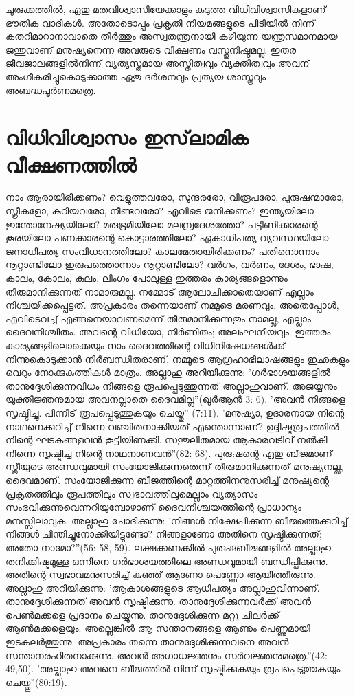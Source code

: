 ചുരുക്കത്തില്‍, ഏതു മതവിശ്വാസിയേക്കാളും കടുത്ത വിധിവിശ്വാസികളാണ് ഭൗതിക വാദികള്‍. അതോടൊപ്പം പ്രകൃതി നിയമങ്ങളുടെ പിടിയില്‍ നിന്ന് കുതറിമാറാനാവാതെ തീര്‍ത്തും അസ്വതന്ത്രനായി കഴിയുന്ന യന്ത്രസമാനമായ ജന്തുവാണ് മനുഷ്യനെന്ന അവരുടെ വീക്ഷണം വസ്തുനിഷ്ഠമല്ല. ഇതര ജീവജാലങ്ങളില്‍നിന്ന് വ്യത്യസ്തമായ അസ്തിത്വവും വ്യക്തിത്വവും അവന് അംഗീകരിച്ചുകൊടുക്കാത്ത ഏതു ദര്‍ശനവും പ്രത്യയ ശാസ്ത്രവും അബദ്ധപൂര്‍ണമത്രെ.

\section{വിധിവിശ്വാസം ഇസ്‌ലാമിക വീക്ഷണത്തില്‍}

നാം ആരായിരിക്കണം? വെളുത്തവരോ, സുന്ദരരോ, വിരൂപരോ, പുരുഷന്മാരോ, സ്ത്രീകളോ, കുറിയവരോ, നീണ്ടവരോ? എവിടെ ജനിക്കണം? ഇന്ത്യയിലോ ഇന്തോനേഷ്യയിലോ? മരുഭൂമിയിലോ മലമ്പ്രദേശത്തോ? പട്ടിണിക്കാരന്റെ കൂരയിലോ പണക്കാരന്റെ കൊട്ടാരത്തിലോ? ഏകാധിപത്യ വ്യവസ്ഥയിലോ ജനാധിപത്യ സംവിധാനത്തിലോ? കാലമേതായിരിക്കണം? പതിനൊന്നാം നൂറ്റാണ്ടിലോ ഇരുപത്തൊന്നാം നൂറ്റാണ്ടിലോ?
വര്‍ഗം, വര്‍ണം, ദേശം, ഭാഷ, കാലം, കോലം, കുലം, ലിംഗം പോലുള്ള ഇത്തരം കാര്യങ്ങളൊന്നും തീരുമാനിക്കുന്നത് നാമാരുമല്ല. നമ്മോട് ആലോചിക്കാതെയാണ് എല്ലാം നിശ്ചയിക്കപ്പെട്ടത്. അപ്രകാരം തന്നെയാണ് നമ്മുടെ മരണവും. അതെപ്പോള്‍, എവിടെവച്ച് എങ്ങനെയാവണമെന്ന് തീരുമാനിക്കുന്നതും നാമല്ല, എല്ലാം ദൈവനിശ്ചിതം. അവന്റെ വിധിയോ, നിര്‍ണിതം; അലംഘനീയവും. ഇത്തരം കാര്യങ്ങളിലൊക്കെയും നാം ദൈവത്തിന്റെ വിധിനിഷേധങ്ങള്‍ക്ക് നിന്നുകൊടുക്കാന്‍ നിര്‍ബന്ധിതരാണ്. നമ്മുടെ ആഗ്രഹാഭിലാഷങ്ങളും ഇഛകളും വെറും നോക്കുകുത്തികള്‍ മാത്രം. അല്ലാഹു അറിയിക്കുന്നു: 'ഗര്‍ഭാശയങ്ങളില്‍ താനുദ്ദേശിക്കുന്നവിധം നിങ്ങളെ രൂപപ്പെടുത്തുന്നത് അല്ലാഹുവാണ്. അജയ്യനും യുക്തിജ്ഞനുമായ അവനല്ലാതെ ദൈവമില്ല''(ഖുര്‍ആന്‍ 3: 6). 'അവന്‍ നിങ്ങളെ സൃഷ്ടിച്ചു. പിന്നീട് രൂപപ്പെടുത്തുകയും ചെയ്തു'' (7:11). 'മനുഷ്യാ, ഉദാരനായ നിന്റെ നാഥനെക്കുറിച്ച് നിന്നെ വഞ്ചിതനാക്കിയത് എന്തൊന്നാണ്? ഉദ്ദിഷ്ടരൂപത്തില്‍ നിന്റെ ഘടകങ്ങളവന്‍ കൂട്ടിയിണക്കി. സന്തുലിതമായ ആകാരവടിവ് നല്‍കി നിന്നെ സൃഷ്ടിച്ച നിന്റെ നാഥനാണവന്‍''(82: 68).
പുരുഷന്റെ ഏതു ബീജമാണ് സ്ത്രീയുടെ അണ്ഡവുമായി സംയോജിക്കുന്നതെന്ന് തീരുമാനിക്കുന്നത് മനുഷ്യനല്ല, ദൈവമാണ്. സംയോജിക്കുന്ന ബീജത്തിന്റെ മാറ്റത്തിനനുസരിച്ച് മനുഷ്യന്റെ പ്രകൃതത്തിലും രൂപത്തിലും സ്വഭാവത്തിലുമെല്ലാം വ്യത്യാസം സംഭവിക്കുന്നുവെന്നറിയുമ്പോഴാണ് ദൈവനിശ്ചയത്തിന്റെ പ്രാധാന്യം മനസ്സിലാവുക. അല്ലാഹു ചോദിക്കുന്നു: 'നിങ്ങള്‍ നിക്ഷേപിക്കുന്ന ബീജത്തെക്കുറിച്ച് നിങ്ങള്‍ ചിന്തിച്ചുനോക്കിയിട്ടുണ്ടോ? നിങ്ങളാണോ അതിനെ സൃഷ്ടിക്കുന്നത്; അതോ നാമോ?''(56: 58, 59).
ലക്ഷക്കണക്കില്‍ പുരുഷബീജങ്ങളില്‍ അല്ലാഹു തനിക്കിഷ്ടമുള്ള ഒന്നിനെ ഗര്‍ഭാശയത്തിലെ അണ്ഡവുമായി ബന്ധിപ്പിക്കുന്നു. അതിന്റെ സ്വഭാവമനുസരിച്ച് കുഞ്ഞ് ആണോ പെണ്ണോ ആയിത്തീരുന്നു. അല്ലാഹു അറിയിക്കുന്നു: 'ആകാശങ്ങളുടെ ആധിപത്യം അല്ലാഹുവിന്നാണ്. താനുദ്ദേശിക്കുന്നത് അവന്‍ സൃഷ്ടിക്കുന്നു. താനുദ്ദേശിക്കുന്നവര്‍ക്ക് അവന്‍ പെണ്‍മക്കളെ പ്രദാനം ചെയ്യുന്നു. താനുദ്ദേശിക്കുന്ന മറ്റു ചിലര്‍ക്ക് ആണ്‍മക്കളെയും. അല്ലെങ്കില്‍ ആ സന്താനങ്ങളെ ആണും പെണ്ണുമായി ഇടകലര്‍ത്തുന്നു. അപ്രകാരം തന്നെ താനുദ്ദേശിക്കുന്നവനെ അവന്‍ സന്താനരഹിതനാക്കുന്നു. അവന്‍ അഗാധജ്ഞനും സര്‍വജ്ഞനുമത്രെ.''(42: 49,50). 'അല്ലാഹു അവനെ ബീജത്തില്‍ നിന്ന് സൃഷ്ടിക്കുകയും രൂപപ്പെടുത്തുകയും ചെയ്തു''(80:19).
